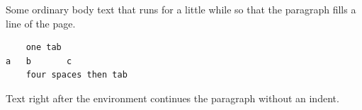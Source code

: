 \documentclass{article}
\begin{document}
Some ordinary body text that runs for a little while so that the paragraph fills a line of the page.
\begin{verbatim}
	one tab
a	b		c
    four spaces	then tab
\end{verbatim}
Text right after the environment continues the paragraph without an indent.
\end{document}
